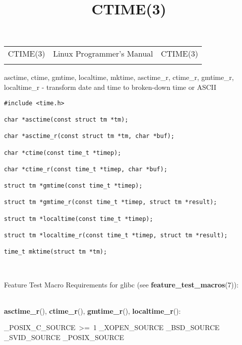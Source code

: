 \documentclass[]{article}
\title{CTIME(3)}
\author{}
\date{}
\let\realtextbf=\textbf
\renewcommand{\textbf}[1]{\textcolor{boldcolor}{\realtextbf{#1}}}
\begin{document}
\maketitle

\begin{longtable}[c]{@{}lll@{}}
\toprule\addlinespace
CTIME(3) & Linux Programmer's Manual & CTIME(3)
\\\addlinespace
\bottomrule
\end{longtable}


asctime, ctime, gmtime, localtime, mktime, asctime\_r, ctime\_r,
gmtime\_r, localtime\_r - transform date and time to broken-down time or
ASCII


\begin{verbatim}
#include <time.h>
 
char *asctime(const struct tm *tm);
 
char *asctime_r(const struct tm *tm, char *buf);
 
char *ctime(const time_t *timep);
 
char *ctime_r(const time_t *timep, char *buf);
 
struct tm *gmtime(const time_t *timep);
 
struct tm *gmtime_r(const time_t *timep, struct tm *result);
 
struct tm *localtime(const time_t *timep);
 
struct tm *localtime_r(const time_t *timep, struct tm *result);
 
time_t mktime(struct tm *tm);
\end{verbatim}

~

Feature Test Macro Requirements for glibc (see
\textbf{feature\_test\_macros}(7)): \\

~

\textbf{asctime\_r}(), \textbf{ctime\_r}(), \textbf{gmtime\_r}(),
\textbf{localtime\_r}():

\_POSIX\_C\_SOURCE~\textgreater{}=~1 \textbar{}\textbar{}
\_XOPEN\_SOURCE \textbar{}\textbar{} \_BSD\_SOURCE \textbar{}\textbar{}
\_SVID\_SOURCE \textbar{}\textbar{} \_POSIX\_SOURCE

\end{document}

